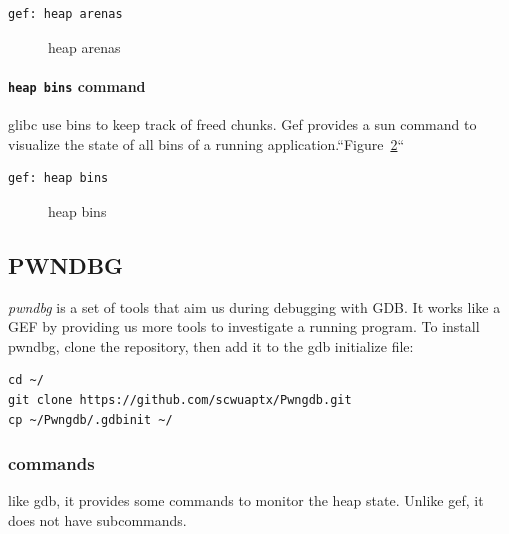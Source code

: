 \documentclass{masterthesis}
\newcommand*\libc{glibc}
\begin{document}
\begin{lstlisting}[frame=tlrb]
gef: heap arenas
\end{lstlisting}

\begin{figure}[h!]
\caption{heap arenas}
\label{fig:gefheaparena}
\end{figure}

\paragraph{\lstinline{heap bins} command}
\libc{} use bins to keep track of freed chunks. Gef provides a sun command to visualize the state of all bins of a running application.``Figure~\ref{fig:gefheapbins}``
\begin{lstlisting}[frame=tlrb]
gef: heap bins
\end{lstlisting}

\begin{figure}[h!]
\caption{heap bins}
\label{fig:gefheapbins}
\end{figure}

\subsection{PWNDBG}
\emph{pwndbg} is a set of tools that aim us during debugging with GDB. It works like a GEF by providing us more tools to investigate a running program.
To install pwndbg, clone the repository, then add it to the gdb initialize file:
\begin{lstlisting}[frame=tlrb]
cd ~/
git clone https://github.com/scwuaptx/Pwngdb.git
cp ~/Pwngdb/.gdbinit ~/
\end{lstlisting}
\subsubsection{commands}
like gdb, it provides some commands to monitor the heap state. Unlike gef, it does not have subcommands.
\end{document}
